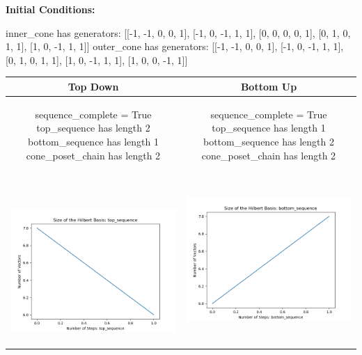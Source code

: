 \documentclass[10pt]{article}
\begin{document}
\textbf{Initial Conditions:}
\begin{SAGE}
inner_cone has generators: 
[[-1, -1, 0, 0, 1], [-1, 0, -1, 1, 1], [0, 0, 0, 0, 1], [0, 1, 0, 1, 1], [1, 0, -1, 1, 1]]
outer_cone has generators: 
[[-1, -1, 0, 0, 1], [-1, 0, -1, 1, 1], [0, 1, 0, 1, 1], [1, 0, -1, 1, 1], [1, 0, 0, -1, 1]]

\end{SAGE}
\begin{tabular}{c|c}
\textbf{Top Down} & \textbf{Bottom Up} \\ \hline  
\begin{SAGE}
	sequence_complete = True
	top_sequence has length 2
	bottom_sequence has length 1
	cone_poset_chain has length 2
\end{SAGE} 
&
\begin{SAGE}
	sequence_complete = True
	top_sequence has length 1
	bottom_sequence has length 2
	cone_poset_chain has length 2
\end{SAGE} 
\\ \hline
\
\begin{minipage}{.45\textwidth}
\includegraphics[width=\textwidth]{"DATA/5d/5 generators 1 bound J/top_sequence SIZE"}
\end{minipage} &
\begin{minipage}{.45\textwidth}
\includegraphics[width=\textwidth]{"DATA/5d/5 generators 1 bound J bottomup/bottom_sequence SIZE"}

\end{minipage}
\end{tabular}
\end{document}
